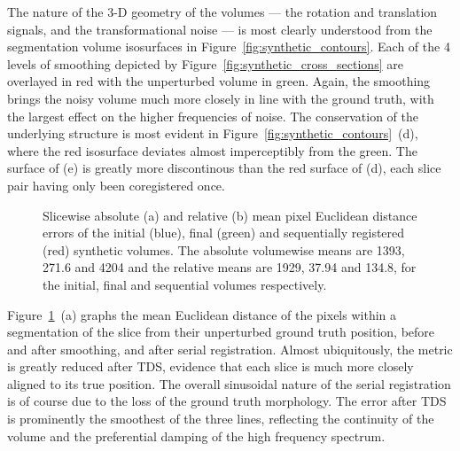   The nature of the 3-D geometry of the volumes --- the rotation and translation signals, and the transformational noise --- is most clearly understood from the segmentation volume isosurfaces in Figure~\ref{fig:synthetic_contours}. Each of the 4 levels of smoothing depicted by Figure~\ref{fig:synthetic_cross_sections} are overlayed in red with the unperturbed volume in green. Again, the smoothing brings the noisy volume much more closely in line with the ground truth, with the largest effect on the higher frequencies of noise. The conservation of the underlying structure is most evident in Figure~\ref{fig:synthetic_contours}~(d), where the red isosurface deviates almost imperceptibly from the green. The surface of (e) is greatly more discontinous than the red surface of (d), each slice pair having only been coregistered once.

  \begin{figure}[!t]
    \caption{Slicewise absolute (a) and relative (b) mean pixel Euclidean distance errors of the initial (blue), final (green) and sequentially registered (red) synthetic volumes. The absolute volumewise means are 1393, 271.6 and 4204 and the relative means are 1929, 37.94 and 134.8, for the initial, final and sequential volumes respectively.}
    \label{fig:synthetic_errors}
  \end{figure}
  Figure~\ref{fig:synthetic_errors}~(a) graphs the mean Euclidean distance of the pixels within a segmentation of the slice from their unperturbed ground truth position, before and after smoothing, and after serial registration. Almost ubiquitously, the metric is greatly reduced after TDS, evidence that each slice is much more closely aligned to its true position. The overall sinusoidal nature of the serial registration is of course due to the loss of the ground truth morphology. The error after TDS is prominently the smoothest of the three lines, reflecting the continuity of the volume and the preferential damping of the high frequency spectrum.

